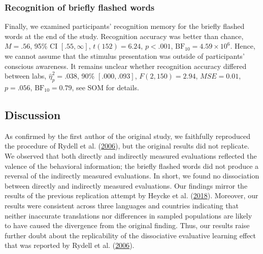 \documentclass[
  man,floatsintext]{apa6}
\begin{document}
\hypertarget{recognition-of-briefly-flashed-words}{%
\subsubsection{Recognition of briefly flashed words}\label{recognition-of-briefly-flashed-words}}

Finally, we examined participants' recognition memory for the briefly flashed words at the end of the study.
Recognition accuracy was better than chance, \(M = .56\), 95\% CI \([.55, \infty]\), \(t(152) = 6.24\), \(p < .001\), \(\mathrm{BF}_{\textrm{10}} = 4.59 \times 10^{6}\).
Hence, we cannot assume that the stimulus presentation was outside of participants' conscious awareness.
It remains unclear whether recognition accuracy differed between labs, \(\hat\eta^2_p = .038\), 90\% \([.000, .093]\), \(F(2, 150) = 2.94\), \(\mathit{MSE} = 0.01\), \(p = .056\), \(\mathrm{BF}_{\textrm{10}} = 0.79\), see SOM for details.

\hypertarget{discussion}{%
\subsection{Discussion}\label{discussion}}

As confirmed by the first author of the original study, we faithfully reproduced the procedure of Rydell et al. (\protect\hyperlink{ref-rydell_two_2006}{2006}), but the original results did not replicate.
We observed that both directly and indirectly measured evaluations reflected the valence of the behavioral information; the briefly flashed words did not produce a reversal of the indirectly measured evaluations.
In short, we found no dissociation between directly and indirectly measured evaluations.
Our findings mirror the results of the previous replication attempt by Heycke et al. (\protect\hyperlink{ref-heycke_two_2018}{2018}).
Moreover, our results were consistent across three languages and countries indicating that neither inaccurate translations nor differences in sampled populations are likely to have caused the divergence from the original finding.
Thus, our results raise further doubt about the replicability of the dissociative evaluative learning effect that was reported by Rydell et al. (\protect\hyperlink{ref-rydell_two_2006}{2006}).
\end{document}
